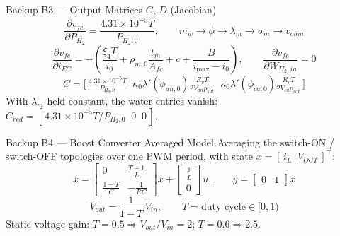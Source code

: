 \documentclass[aspectratio=169,11pt]{beamer}
\begin{document}
\begin{frame}{Backup B3 --- Output Matrices $C$, $D$ (Jacobian)}
    \footnotesize
    \[
        \frac{\partial v_{fc}}{\partial P_{H_2}}=\frac{4.31\times10^{-5}T}{P_{H_2,0}},
        \qquad
        m_w \rightarrow \phi \rightarrow \lambda_m \rightarrow \sigma_m \rightarrow v_{ohm}
    \]
    \[
        \frac{\partial v_{fc}}{\partial i_{FC}}=
        -\!\left(\frac{\xi_4 T}{i_0}+\rho_{m,0}\frac{t_m}{A_{fc}}+c+\frac{B}{i_{\max}-i_0}\right),
        \qquad
        \frac{\partial v_{fc}}{\partial W_{H_2,in}}=0
    \]
    \[
        C=\big[\,\tfrac{4.31\times10^{-5}T}{P_{H_2,0}}\;\;
        \kappa_0\lambda'(\phi_{an,0})\tfrac{R_vT}{2V_{an}p_{sat}}\;\;
        \kappa_0\lambda'(\phi_{ca,0})\tfrac{R_vT}{2V_{ca}p_{sat}}\,\big]
    \]
    \scriptsize With $\lambda_m$ held constant, the water entries vanish:
    $C_{red}=[\,4.31\times10^{-5}T/P_{H_2,0}\;\;0\;\;0\,]$.
\end{frame}

\begin{frame}{Backup B4 --- Boost Converter Averaged Model}
    \footnotesize
    Averaging the switch-ON / switch-OFF topologies over one PWM period, with
    state $x=[\,i_L\;\;V_{OUT}\,]^{\top}$:
    \[
        \dot{x}=
        \begin{bmatrix} 0 & \tfrac{T-1}{L}\\[4pt] \tfrac{1-T}{C} & -\tfrac{1}{RC}\end{bmatrix}x
        +\begin{bmatrix} \tfrac{1}{L}\\[4pt] 0\end{bmatrix}u,
        \qquad
        y=\begin{bmatrix}0&1\end{bmatrix}x
    \]
    \[
        V_{out}=\frac{1}{1-T}\,V_{in},\qquad T=\text{duty cycle}\in[0,1)
    \]
    \scriptsize Static voltage gain: $T=0.5\Rightarrow V_{out}/V_{in}=2$;
    $T=0.6\Rightarrow 2.5$.
\end{frame}
\end{document}
